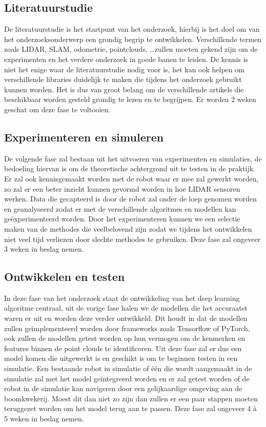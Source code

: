 \subsection{Literatuurstudie}

De literatuurstudie is het startpunt van het onderzoek, hierbij is het doel om van het onderzoeksonderwerp een grondig begrip te ontwikkelen.
Verschillende termen zoals LIDAR, SLAM, odometrie, pointclouds, \ldots zullen moeten gekend zijn om de experimenten en het verdere onderzoek in goede banen te leiden.
De kennis is niet het enige waar de literatuurstudie nodig voor is, het kan ook helpen om verschillende libraries duidelijk te maken die tijdens het onderzoek gebruikt kunnen worden.
Het is dus van groot belang om de verschillende artikels die beschikbaar worden gesteld grondig te lezen en te begrijpen.
Er worden 2 weken geschat om deze fase te voltooien.

\subsection{Experimenteren en simuleren}

De volgende fase zal bestaan uit het uitvoeren van experimenten en simulaties, de bedoeling hiervan is om de theoretische achtergrond uit te testen in de praktijk.
Er zal ook kennisgemaakt worden met de robot waar er mee zal gewerkt worden, zo zal er een beter inzicht kunnen gevormd worden in hoe LIDAR sensoren werken.
Data die gecapteerd is door de robot zal onder de loep genomen worden en geanalyseerd zodat er met de verschillende algoritmes en modellen kan geëxperimenteerd worden.
Door het experimenteren kunnen we een selectie maken van de methodes die veelbelovend zijn zodat we tijdens het ontwikkelen niet veel tijd verliezen door slechte methodes te gebruiken.
Deze fase zal ongeveer 3 weken in beslag nemen.

\subsection{Ontwikkelen en testen}

In deze fase van het onderzoek staat de ontwikkeling van het deep learning algoritme centraal, uit de vorige fase halen we de modellen die het accuraatst waren er uit en worden deze verder ontwikkeld.
Dit houdt in dat de modellen zullen geïmplementeerd worden door frameworks zoals Tensorflow of PyTorch, ook zullen de modellen getest worden op hun vermogen om de kenmerken en features binnen de point clouds te identificeren.
Uit deze fase zal er dus een model komen die uitgewerkt is en geschikt is om te beginnen testen in een simulatie.
Een bestaande robot in simulatie of één die wordt aangemaakt in de simulatie zal met het model geïntegreerd worden en er zal getest worden of de robot in de simulatie kan navigeren door een gelijkaardige omgeving aan de boomkwekerij.
Moest dit dan niet zo zijn dan zullen er een paar stappen moeten teruggezet worden om het model terug aan te passen.
Deze fase zal ongeveer 4 à 5 weken in beslag nemen.

